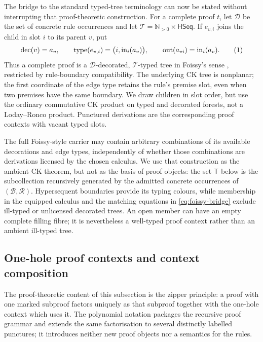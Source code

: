 \documentclass[10pt,a4paper]{article}
\theoremstyle{plain}
\theoremstyle{definition}
\theoremstyle{remark}
\newcommand{\Base}{\mathcal B}
\newcommand{\Rules}{\mathcal R}
\newcommand{\Trees}{\mathsf T}
\newcommand{\HSeq}{\mathsf{HSeq}}
\newcommand{\eqtag}{\refstepcounter{equation}\tag{\theequation}}
\begin{document}
The bridge to the standard typed-tree terminology can now be stated without
interrupting that proof-theoretic construction.  For a complete proof
\(t\), let \(\mathcal D\) be the set of concrete rule occurrences and let
\(\mathcal T=\mathbb N_{>0}\times\HSeq\).  If \(e_{v,i}\) joins the child in
slot \(i\) to its parent \(v\), put
\[
 \operatorname{dec}(v)=a_v,\qquad
 \operatorname{type}(e_{v,i})
  =\bigl(i,\operatorname{in}_i(a_v)\bigr),
 \qquad
 \operatorname{out}(a_{vi})=\operatorname{in}_i(a_v).
\eqtag\label{eq:foissy-bridge}
\]
Thus a complete proof is a
\(\mathcal D\)-decorated, \(\mathcal T\)-typed tree in Foissy's sense
\cite{foissy2021typed}, restricted by rule-boundary compatibility.  The
underlying CK tree is nonplanar; the first coordinate of the edge type
retains the rule's premise slot, even when two premises have the same
boundary.  We draw children in slot order, but use the ordinary commutative
CK product on typed and decorated forests, not a Loday--Ronco product.
Punctured derivations are the corresponding proof contexts with vacant
typed slots.

The full Foissy-style carrier may contain arbitrary combinations of its
available decorations and edge types, independently of whether those
combinations are derivations licensed by the chosen calculus.  We use that
construction as the ambient CK
theorem, but not as the basis of proof objects: the set \(\Trees\) below is
the subcollection recursively generated by the admitted concrete
occurrences of \((\Base,\Rules)\).  Hypersequent boundaries provide its
typing colours, while membership in the equipped calculus and the matching
equations in \eqref{eq:foissy-bridge} exclude ill-typed or unlicensed
decorated trees.  An open member can have an empty complete filling fibre;
it is nevertheless a well-typed proof context rather than an ambient
ill-typed tree.

\subsection{One-hole proof contexts and context composition}
\label{subsec:proof-polynomial}

The proof-theoretic content of this subsection is the zipper principle:
a proof with one marked subproof factors uniquely as that subproof together
with the one-hole context which uses it.  The polynomial notation packages
the recursive proof grammar and extends the same factorisation to several
distinctly labelled punctures; it introduces neither new proof objects nor
a semantics for the rules.
\end{document}
